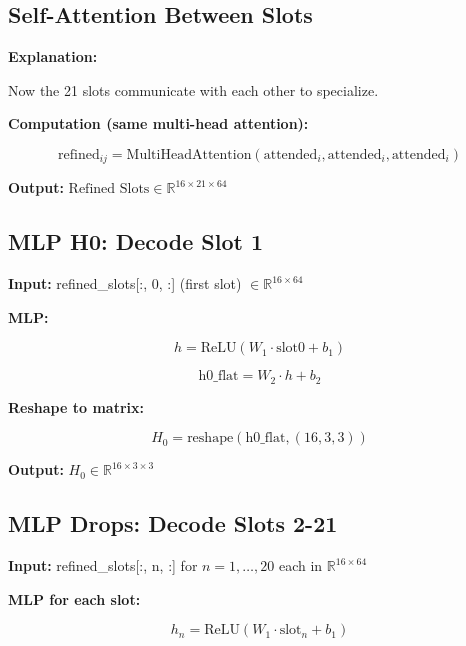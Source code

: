 \documentclass[11pt,a4paper]{article}
\begin{document}
\subsection{Self-Attention Between Slots}

\textbf{Explanation:}

Now the 21 slots communicate with each other to specialize.

\textbf{Computation (same multi-head attention):}

\begin{equation}
\text{refined}_{ij} = \text{MultiHeadAttention}(\text{attended}_i, \text{attended}_i, \text{attended}_i)
\end{equation}

\textbf{Output:} $\text{Refined Slots} \in \mathbb{R}^{16 \times 21 \times 64}$

\subsection{MLP H0: Decode Slot 1}

\textbf{Input:} refined\_slots[:, 0, :] (first slot) $\in \mathbb{R}^{16 \times 64}$

\textbf{MLP:}

\begin{equation}
h = \text{ReLU}(W_1 \cdot \text{slot0} + b_1)
\end{equation}

\begin{equation}
\text{h0\_flat} = W_2 \cdot h + b_2
\end{equation}

\textbf{Reshape to matrix:}

\begin{equation}
H_0 = \text{reshape}(\text{h0\_flat}, (16, 3, 3))
\end{equation}

\textbf{Output:} $H_0 \in \mathbb{R}^{16 \times 3 \times 3}$

\subsection{MLP Drops: Decode Slots 2-21}

\textbf{Input:} refined\_slots[:, n, :] for $n = 1, \ldots, 20$ each in $\mathbb{R}^{16 \times 64}$

\textbf{MLP for each slot:}

\begin{equation}
h_n = \text{ReLU}(W_1 \cdot \text{slot}_n + b_1)
\end{equation}
\end{document}

